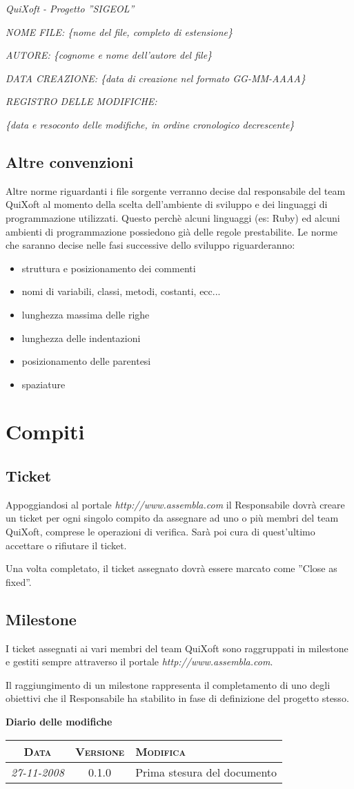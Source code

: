 \documentclass[11pt,a4paper]{article}
\newcommand{\modifiche} 
{
\newpage
\begin{center}
\textbf{Diario delle modifiche} \\
\bigskip
\begin{tabular}{|c|c|p{0.69\textwidth}|}
\hline
\textsc{Data} & \textsc{Versione} & \textsc{Modifica} \\
\hline
\hline
\textit{27-11-2008} & 0.1.0 & Prima stesura del documento \\
\hline
\end{tabular}
\end{center}
}
\begin{document}
\textit{QuiXoft - Progetto ''SIGEOL''}

\textit{NOME FILE: \{nome del file, completo di estensione\}}

\textit{AUTORE: \{cognome e nome dell'autore del file\}}

\textit{DATA CREAZIONE: \{data di creazione nel formato GG-MM-AAAA\}}

\textit{REGISTRO DELLE MODIFICHE:}

\textit{\{data e resoconto delle modifiche, in ordine cronologico decrescente\}}
\subsection{Altre convenzioni}
Altre norme riguardanti i file sorgente verranno decise dal responsabile del team QuiXoft al momento della scelta dell'ambiente di sviluppo e dei linguaggi di programmazione utilizzati. Questo perchè alcuni linguaggi (es: Ruby) ed alcuni ambienti di programmazione possiedono già delle regole prestabilite. Le norme che saranno decise nelle fasi successive dello sviluppo riguarderanno:
\begin{itemize}
	\item struttura e posizionamento dei commenti
	\item nomi di variabili, classi, metodi, costanti, ecc...
	\item lunghezza massima delle righe
	\item lunghezza delle indentazioni
	\item posizionamento delle parentesi
	\item spaziature
\end{itemize}
\section{Compiti}
\subsection{Ticket}
Appoggiandosi al portale \textit{http://www.assembla.com} il Responsabile dovrà creare un ticket per ogni singolo compito da assegnare ad uno o più membri del team QuiXoft, comprese le operazioni di verifica.
Sarà poi cura di quest'ultimo accettare o rifiutare il ticket.

Una volta completato, il ticket assegnato dovrà essere marcato come ''Close as fixed''.
\subsection{Milestone}
I ticket assegnati ai vari membri del team QuiXoft sono raggruppati in milestone e gestiti sempre attraverso il portale \textit{http://www.assembla.com}.

Il raggiungimento di un milestone rappresenta il completamento di uno degli obiettivi che il Responsabile ha stabilito in fase di definizione del progetto stesso.
\modifiche
\end{document}
